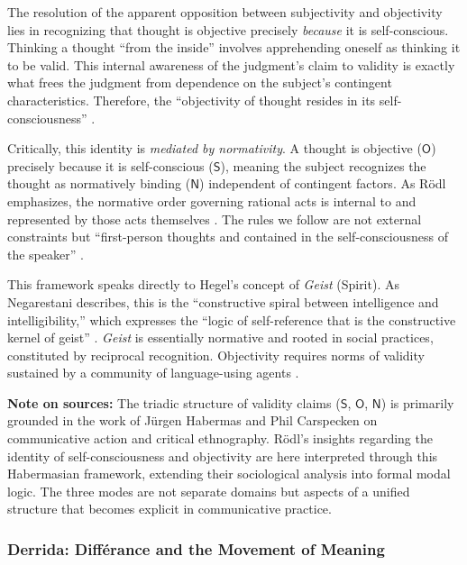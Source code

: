 \documentclass[12pt]{book}
\begin{document}
The resolution of the apparent opposition between subjectivity and objectivity lies in recognizing that thought is objective precisely \textit{because} it is self-conscious. Thinking a thought ``from the inside'' involves apprehending oneself as thinking it to be valid. This internal awareness of the judgment's claim to validity is exactly what frees the judgment from dependence on the subject's contingent characteristics. Therefore, the ``objectivity of thought resides in its self-consciousness'' \parencite[11]{Rodl:2018aa}.

Critically, this identity is \textit{mediated by normativity}. A thought is objective ($\mathsf{O}$) precisely because it is self-conscious ($\mathsf{S}$), meaning the subject recognizes the thought as normatively binding ($\mathsf{N}$) independent of contingent factors. As Rödl emphasizes, the normative order governing rational acts is internal to and represented by those acts themselves \parencite{Rodl:2007aa, Negarestani2018}. The rules we follow are not external constraints but ``first-person thoughts and contained in the self-consciousness of the speaker'' \parencite[33]{Rodl:2018aa}.

This framework speaks directly to Hegel's concept of \textit{Geist} (Spirit). As Negarestani describes, this is the ``constructive spiral between intelligence and intelligibility,'' which expresses the ``logic of self-reference that is the constructive kernel of geist'' \parencite[25]{Negarestani2018}. \textit{Geist} is essentially normative and rooted in social practices, constituted by reciprocal recognition. Objectivity requires norms of validity sustained by a community of language-using agents \parencite{Negarestani2018}.

\textbf{Note on sources:} The triadic structure of validity claims ($\mathsf{S}$, $\mathsf{O}$, $\mathsf{N}$) is primarily grounded in the work of Jürgen Habermas and Phil Carspecken on communicative action and critical ethnography. Rödl's insights regarding the identity of self-consciousness and objectivity are here interpreted through this Habermasian framework, extending their sociological analysis into formal modal logic. The three modes are not separate domains but aspects of a unified structure that becomes explicit in communicative practice.

\subsubsection{Derrida: Différance and the Movement of Meaning}
\end{document}
